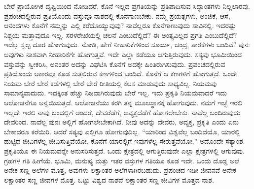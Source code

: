 ಬೇರೆ ಪ್ರಾಯೋಗಿಕ ದೃಷ್ಟಿಯಿಂದ ನೋಡಿದರೆ, ಕೊನೆ ಇಲ್ಲದ ಪ್ರಗತಿಯನ್ನು ಪ್ರತಿಪಾದಿಸುವ ಸಿದ್ಧಾಂತಗಳು ನಿಲ್ಲಲಾರವು. ಪ್ರಪಂಚದಲ್ಲಿರುವ ಪ್ರತಿಯೊಂದು ವಸ್ತುವೂ ನಾಶದಲ್ಲಿ ಕೊನೆಗಾಣಬೇಕು. ನಮ್ಮ ಪ್ರಯತ್ನಗಳು, ಅಂಜಿಕೆ, ಆಸೆ, ಆನಂದಗಳು ಕೊನೆಗೆ ನಮ್ಮನ್ನು ಎಲ್ಲಿ ಕರೆದೊಯ್ಯುವುವು? ನಾವೆಲ್ಲರೂ ಕೊನೆಗಾಣುವುದು ಸಾವಿನಲ್ಲಿ. ಇದರಷ್ಟು ನಿಶ್ಚಯ ಮತ್ತಾವುದೂ ಇಲ್ಲ. ಸರಳರೇಖೆಯಲ್ಲಿ ಚಲನೆ ಎಂಬುದೆಲ್ಲಿದೆ? ಈ ಅಂತ್ಯವಿಲ್ಲದ ಪ್ರಗತಿ ಎಂಬುದೆಲ್ಲಿದೆ? ಇದೆಲ್ಲ ಸ್ವಲ್ಪ ದೂರ ಹೋಗುವುದು. ನೋಡಿ, ಹೇಗೆ ನೀಹಾರಿಕೆಗಳಿಂದ ಸೂರ್ಯ, ಚಂದ್ರ, ತಾರಕೆಗಳು ಬಂದಿವೆ? ಪುನಃ ಅವುಗಳು ನಾಶವಾಗಿ ನೀಹಾರಿಕೆಗೇ ಹೋಗುತ್ತವೆ. ಇದೇ ಎಲ್ಲಾ ಕಡೆಯೂ ಆಗುತ್ತಿರುವುದು. ಸಸ್ಯವು ಭೂಮಿಯಿಂದ ವಸ್ತುವನ್ನು ಸ್ವೀಕರಿಸಿ, ಅನಂತರ ಅದನ್ನು ವಿಘಟಿಸಿ ಕೊನೆಗೆ ಅದಕ್ಕೇ ಹಿಂತಿರುಗಿಸುವುದು. ಪ್ರಪಂಚದಲ್ಲಿರುವ ಪ್ರತಿಯೊಂದು ಆಕಾರವೂ ಕೂಡ ಸುತ್ತಲಿರುವ ಕಣಗಳಿಂದ ಬಂದಿದೆ. ಕೊನೆಗೆ ಆ ಕಣಗಳಿಗೆ ಹೋಗುತ್ತದೆ. ಒಂದೇ ನಿಯಮ ಬೇರೆ ಬೇರೆ ಕಡೆಗಳಲ್ಲಿ ಬೇರೆ ಬೇರೆ ರೀತಿಯಲ್ಲಿ ಕೆಲಸ ಮಾಡುವುದು ಸಾಧ್ಯವಿಲ್ಲ. ನಿಯಮವು ಸಾಮಾನ್ಯವಾದುದು. ಇದಕ್ಕಿಂತ ಹೆಚ್ಚು ನಿಜವಾಗಿರುವುದು ಬೇರೆ ಇಲ್ಲ. ಇದು ಪ್ರಕೃತಿ ನಿಯಮವಾದರೆ ಇದು ಆಲೋಚನೆಗೂ ಅನ್ವಯಿಸುತ್ತದೆ. ಆಲೋಚನೆಯು ಕರಗಿ ತನ್ನ ಮೂಲಸ್ಥಾನಕ್ಕೆ ಹೋಗುವುದು. ನಮಗೆ ಇಚ್ಛೆ ಇರಲಿ ಇಲ್ಲದೇ ಇರಲಿ ನಾವು ಬಂದಲ್ಲಿಗೆ ಅಂದರೆ, ದೇವರೆಡೆಗೆ, ಅವ್ಯಕ್ತದೆಡೆಗೆ ಹೋಗಲೇಬೇಕು. ನಾವೆಲ್ಲ ಬಂದಿರುವುದು ದೇವರಿಂದ. ನಾವೆಲ್ಲ ಪುನಃ ಅಲ್ಲಿಗೆ ಹೋಗಲೇಬೇಕಾಗಿದೆ. ನೀವು ಅದನ್ನು ದೇವರು, ಅವ್ಯಕ್ತ, ಪ್ರಕೃತಿ ಎಂದು ಏನು ಬೇಕಾದರೂ ಕರೆಯಿರಿ. ಆದರೆ ಸತ್ಯವು ಎಲ್ಲಿಗೂ ಹೋಗುವುದಿಲ್ಲ. “ಯಾರಿಂದ ವಿಶ್ವವೆಲ್ಲ ಬಂದಿದೆಯೊ, ಯಾರಲ್ಲಿ ಹುಟ್ಟಿದ ಜೀವಿಗಳೆಲ್ಲ ಜೀವಿಸುತ್ತಿವೆಯೋ, ಕೊನೆಗೆ ಯಾರಲ್ಲಿಗೆ ಇವುಗಳೆಲ್ಲ ಸೇರುತ್ತವೆಯೋ,” ಅದೊಂದೇ ಸತ್ಯಾಂಶ. ಪ್ರಕೃತಿಯೂ ಈ ನಿಯಮವನ್ನೇ ಅನುಸರಿಸುತ್ತದೆ. ಒಂದು ಕ್ಷೇತ್ರದಲ್ಲಿ ಆಗುತ್ತಿರುವುದೇ ಎಲ್ಲಾ ಕ್ಷೇತ್ರಗಳಲ್ಲಿ ಆಗುವುವು. ಗ್ರಹಗಳ ಗತಿ ಹೀಗೆಯೆ. ಭೂಮಿ, ಮನುಷ್ಯ ಮತ್ತು ಇತರ ವಸ್ತುಗಳ ಗತಿಯೂ ಕೂಡ ಇದೇ. ಒಂದು ದೊಡ್ಡ ಅಲೆ ಅನೇಕ ಸಣ್ಣ ಅಲೆಗಳ ಮೊತ್ತ, ಅವುಗಳು ಲಕ್ಷಾಂತರ ಅಲೆಗಳಾಗಿರಬಹುದು. ಪ್ರಪಂಚದ ಇಡೀ ಜೀವನವೆ ಅನೇಕ ಲಕ್ಷಾಂತರ ಸಣ್ಣ ಜೀವಗಳ ಮೊತ್ತ. ಒಟ್ಟು ವಿಶ್ವದ ನಾಶವೆ ಲಕ್ಷಾಂತರ ಸಣ್ಣ ಜೀವಿಗಳ ಮೊತ್ತದ ನಾಶ. 

